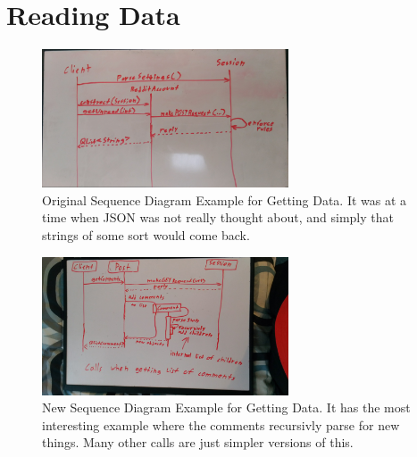 \documentclass[12pt]{article}
\begin{document}
\section{Reading Data}
\begin{figure}[ht]
	\centering
	\caption{Original Sequence Diagram Example for Getting Data. It was at a time when JSON was not really thought about, and simply that strings of some sort would come back.}
	\label{sequence1}
	\includegraphics[width=0.65\textwidth]{sequence1.jpg}
	\vspace{-10pt}
\end{figure}
\begin{figure}[ht]
	\centering
	\caption{New Sequence Diagram Example for Getting Data. It has the most interesting example where the comments recursivly parse for new things. Many other calls are just simpler versions of this.}
	\label{sequence2}
	\includegraphics[width=0.65\textwidth]{sequence2.jpg}
	\vspace{-10pt}
\end{figure}

\clearpage
\end{document}
